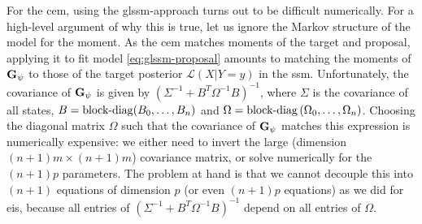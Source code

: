 For the \gls{cem}, using the \gls{glssm}-approach turns out to be difficult numerically. For a high-level argument of why this is true, let us ignore the Markov structure of the model for the moment. As the \gls{cem} matches moments of the target and proposal, applying it to fit model \eqref{eq:glssm-proposal} amounts to matching the moments of $\mathbf G_{\psi}$ to those of the target posterior $\mathcal L (X | Y = y)$ in the \gls{ssm}. Unfortunately, the covariance of $\mathbf G_{\psi}$ is given by $ \left( \Sigma^{-1} + B^{T}\Omega^{-1} B \right)^{-1}$, where $\Sigma$ is the covariance of all states, $B = \operatorname{block-diag} (B_{0}, \dots, B_{n})$ and $\Omega = \operatorname{block-diag} \left( \Omega_{0}, \dots, \Omega_{n} \right)$. Choosing the diagonal matrix $\Omega$ such that the covariance of $\mathbf G_{\psi}$ matches this expression is numerically expensive: we either need to invert the large (dimension $(n + 1)m \times (n + 1)m$) covariance matrix, or solve numerically for the $(n + 1)p$ parameters. The problem at hand is that we cannot decouple this into $(n + 1)$ equations of dimension $p$ (or even $(n+1)p$ equations) as we did for \gls{eis}, because all entries of $(\Sigma^{-1} + B^{T}\Omega^{-1} B)^{-1}$ depend on all entries of $\Omega$. 

